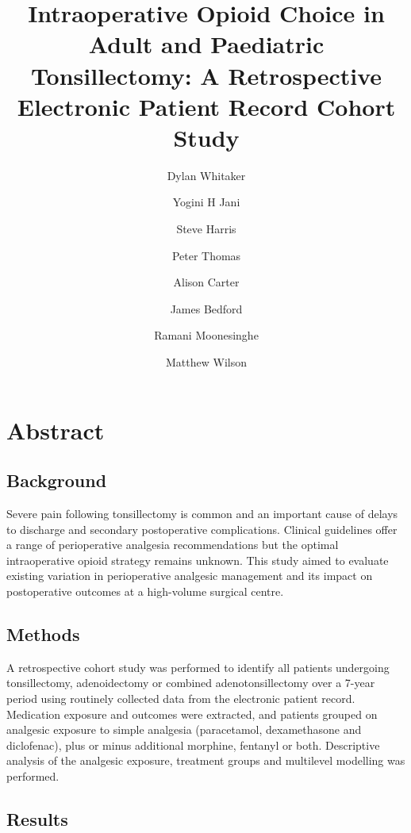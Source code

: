 \documentclass[
  letterpaper,
  DIV=11,
  numbers=noendperiod]{scrreprt}
\title{Intraoperative Opioid Choice in Adult and Paediatric
Tonsillectomy: A Retrospective Electronic Patient Record Cohort Study}
\author{Dylan Whitaker \and Yogini H Jani \and Steve Harris \and Peter
Thomas \and Alison Carter \and James Bedford \and Ramani
Moonesinghe \and Matthew Wilson}
\date{}
\renewcommand*\contentsname{Table of contents}
\newcommand\contentsname{Table of contents}
\begin{document}
\maketitle

\renewcommand*\contentsname{Table of contents}
{
\setcounter{tocdepth}{2}
\tableofcontents
}


\chapter*{Abstract}\label{abstract}


\section*{Background}\label{background}


Severe pain following tonsillectomy is common and an important cause of
delays to discharge and secondary postoperative complications. Clinical
guidelines offer a range of perioperative analgesia recommendations but
the optimal intraoperative opioid strategy remains unknown. This study
aimed to evaluate existing variation in perioperative analgesic
management and its impact on postoperative outcomes at a high-volume
surgical centre.

\section*{Methods}\label{methods}


A retrospective cohort study was performed to identify all patients
undergoing tonsillectomy, adenoidectomy or combined adenotonsillectomy
over a 7-year period using routinely collected data from the electronic
patient record. Medication exposure and outcomes were extracted, and
patients grouped on analgesic exposure to simple analgesia (paracetamol,
dexamethasone and diclofenac), plus or minus additional morphine,
fentanyl or both. Descriptive analysis of the analgesic exposure,
treatment groups and multilevel modelling was performed.

\section*{Results}\label{results}
\end{document}
